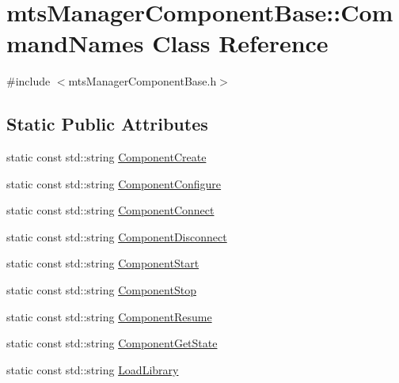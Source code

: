 \hypertarget{classmts_manager_component_base_1_1_command_names}{}\section{mts\+Manager\+Component\+Base\+:\+:Command\+Names Class Reference}
\label{classmts_manager_component_base_1_1_command_names}


{\ttfamily \#include $<$mts\+Manager\+Component\+Base.\+h$>$}

\subsection*{Static Public Attributes}
\begin{DoxyCompactItemize}
\item 
static const std\+::string \hyperlink{classmts_manager_component_base_1_1_command_names_a626492bb2a1047dba2630effc9369845}{Component\+Create}
\item 
static const std\+::string \hyperlink{classmts_manager_component_base_1_1_command_names_a04c7cfcff4f8fb2714238b76f4dfcc1b}{Component\+Configure}
\item 
static const std\+::string \hyperlink{classmts_manager_component_base_1_1_command_names_ad15c418f6353bf966fa5b8a789ff4b03}{Component\+Connect}
\item 
static const std\+::string \hyperlink{classmts_manager_component_base_1_1_command_names_a3e40d4c8b07d7a552a98f423e1327765}{Component\+Disconnect}
\item 
static const std\+::string \hyperlink{classmts_manager_component_base_1_1_command_names_ae9bb155e348493addc9662716834a8ad}{Component\+Start}
\item 
static const std\+::string \hyperlink{classmts_manager_component_base_1_1_command_names_ac98b5846e8a3493bc33540b66db648e5}{Component\+Stop}
\item 
static const std\+::string \hyperlink{classmts_manager_component_base_1_1_command_names_ab626b2d820041797059ab01274902c0e}{Component\+Resume}
\item 
static const std\+::string \hyperlink{classmts_manager_component_base_1_1_command_names_a96cef8ff65e6f39681080b5e675a21af}{Component\+Get\+State}
\item 
static const std\+::string \hyperlink{classmts_manager_component_base_1_1_command_names_a16506481a4ed4160018c87e368cec962}{Load\+Library}
\item 

\end{DoxyCompactItemize}
